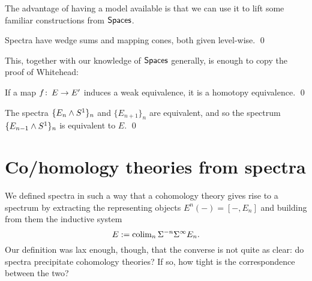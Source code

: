 The advantage of having a model available is that we can use it to lift some familiar constructions from $\mathsf{Spaces}$.

\begin{lemma}
Spectra have wedge sums and mapping cones, both given level-wise. \qed
\end{lemma}

This, together with our knowledge of $\mathsf{Spaces}$ generally, is enough to copy the proof of Whitehead:

\begin{theorem}
If a map $f\colon\thinspace E \to E'$ induces a weak equivalence, it is a homotopy equivalence. \qed
\end{theorem}

\begin{corollary}
The spectra $\{E_n \wedge S^1\}_n$ and $\{E_{n+1}\}_n$ are equivalent, and so the spectrum $\{E_{n-1} \wedge S^1\}_n$ is equivalent to $E$. \qed
\end{corollary}






\section{Co/homology theories from spectra}

We defined spectra in such a way that a cohomology theory gives rise to a spectrum by extracting the representing objects $E^n(-) = [-, E_n]$ and building from them the inductive system \[E := \operatorname{colim}_n \Sigma^{-n} \Sigma^\infty E_n.\]
Our definition was lax enough, though, that the converse is not quite as clear: do spectra precipitate cohomology theories?
If so, how tight is the correspondence between the two?

